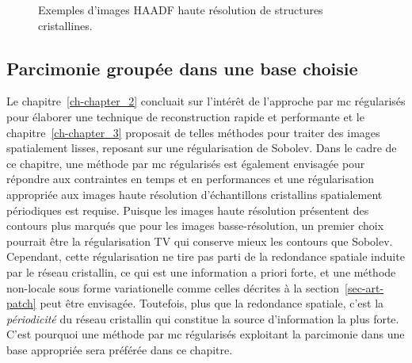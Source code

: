 \begin{figure}
   \centering
   \caption{\protect\label{fig-chap4-HR-crist}Exemples d'images HAADF haute résolution de structures cristallines.}
\end{figure}



\subsection{Parcimonie groupée dans une base choisie}

Le chapitre~\ref{ch-chapter_2} concluait sur l'intérêt de l'approche par \gls{mc} régularisés pour élaborer une technique de reconstruction rapide et performante et le chapitre~\ref{ch-chapter_3} proposait de telles méthodes pour traiter des images spatialement lisses, reposant sur une régularisation de Sobolev. 
%
Dans le cadre de ce chapitre, une méthode par \gls{mc} régularisés est également envisagée pour répondre aux contraintes en temps et en performances et une régularisation appropriée aux images haute résolution d'échantillons cristallins spatialement périodiques est requise.
%
Puisque les images haute résolution présentent des contours plus marqués que pour les images basse-résolution, un premier choix pourrait être la régularisation TV qui conserve mieux les contours que Sobolev. Cependant, cette régularisation ne tire pas parti de la redondance spatiale induite par le réseau cristallin, ce qui est une information a priori forte, et une méthode non-locale sous forme variationelle comme celles décrites à la section~\ref{sec-art-patch} peut être envisagée. Toutefois, plus que la redondance spatiale, c'est la \emph{périodicité} du réseau cristallin qui constitue la source d'information la plus forte. C'est pourquoi une méthode par \gls{mc} régularisés exploitant la parcimonie dans une base appropriée sera préférée dans ce chapitre. 

